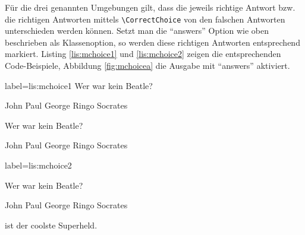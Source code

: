 Für die drei genannten Umgebungen gilt, dass die jeweils richtige Antwort bzw. die richtigen Antworten mittels \texttt{\textbackslash CorrectChoice} von den falschen Antworten unterschieden werden können. 
Setzt man die \enquote{answers} Option wie oben beschrieben als Klassenoption, so werden diese richtigen Antworten entsprechend markiert. 
Listing \ref{lis:mchoice1} und \ref{lis:mchoice2} zeigen die entsprechenden Code-Beispiele, Abbildung \ref{fig:mchoicea} die Ausgabe mit \enquote{answers} aktiviert.

\begin{lfgwcode}{label={lis:mchoice1}}
\question Wer war kein Beatle?

\begin{choices}
\choice John
\choice Paul
\choice George
\choice Ringo
\CorrectChoice Socrates
\end{choices}

\question Wer war kein Beatle?

\begin{checkboxes}
\choice John
\choice Paul
\choice George
\choice Ringo
\CorrectChoice Socrates
\end{checkboxes}
\end{lfgwcode}

\clearpage

\begin{lfgwcode}{label={lis:mchoice2}}

\question Wer war kein Beatle?

\begin{oneparcheckboxes}
\choice John
\choice Paul
\choice George
\choice Ringo
\CorrectChoice Socrates
\end{oneparcheckboxes}

\question {} ist der coolste Superheld.

\end{lfgwcode}

